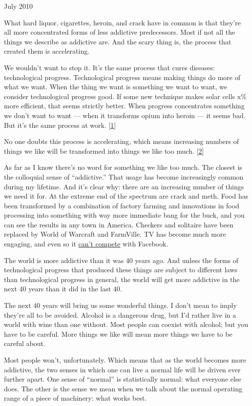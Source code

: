 July 2010

What hard liquor, cigarettes, heroin, and crack have in common is that
they're all more concentrated forms of less addictive predecessors. Most
if not all the things we describe as addictive are. And the scary thing
is, the process that created them is accelerating.

We wouldn't want to stop it. It's the same process that cures diseases:
technological progress. Technological progress means making things do
more of what we want. When the thing we want is something we want to
want, we consider technological progress good. If some new technique
makes solar cells x\% more efficient, that seems strictly better. When
progress concentrates something we don't want to want --- when it
transforms opium into heroin --- it seems bad. But it's the same process
at work. {[}\hyperref[f1n]{1}{]}

No one doubts this process is accelerating, which means increasing
numbers of things we like will be transformed into things we like too
much. {[}\hyperref[f2n]{2}{]}

As far as I know there's no word for something we like too much. The
closest is the colloquial sense of ``addictive.'' That usage has become
increasingly common during my lifetime. And it's clear why: there are an
increasing number of things we need it for. At the extreme end of the
spectrum are crack and meth. Food has been transformed by a combination
of factory farming and innovations in food processing into something
with way more immediate bang for the buck, and you can see the results
in any town in America. Checkers and solitaire have been replaced by
World of Warcraft and FarmVille. TV has become much more engaging, and
even so it \href{convergence.html}{can't compete} with Facebook.

The world is more addictive than it was 40 years ago. And unless the
forms of technological progress that produced these things are subject
to different laws than technological progress in general, the world will
get more addictive in the next 40 years than it did in the last 40.

The next 40 years will bring us some wonderful things. I don't mean to
imply they're all to be avoided. Alcohol is a dangerous drug, but I'd
rather live in a world with wine than one without. Most people can
coexist with alcohol; but you have to be careful. More things we like
will mean more things we have to be careful about.

Most people won't, unfortunately. Which means that as the world becomes
more addictive, the two senses in which one can live a normal life will
be driven ever further apart. One sense of ``normal'' is statistically
normal: what everyone else does. The other is the sense we mean when we
talk about the normal operating range of a piece of machinery: what
works best.

